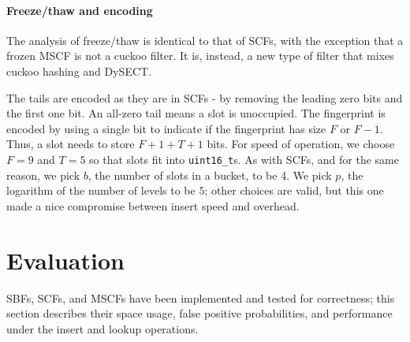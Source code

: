 \documentclass[letterpaper,twocolumn,10pt]{article}
\newcommand{\taffy}{stretchy}
\newcommand{\TBF}{SBF}
\newcommand{\TCF}{SCF}
\newcommand{\MTCF}{MSCF}
\newcommand{\taffy}{taffy}
\newcommand{\TBF}{TBF}
\newcommand{\TCF}{TCF}
\newcommand{\MTCF}{MTCF}
\begin{document}
\paragraph{Freeze/thaw and encoding}
The analysis of freeze/thaw is identical to that of \TCF{}s, with the exception that a frozen \MTCF{} is not a cuckoo filter.
It is, instead, a new type of filter that mixes cuckoo hashing and DySECT.

The tails are encoded as they are in \TCF{}s - by removing the leading zero bits and the first one bit.
An all-zero tail means a slot is unoccupied.
The fingerprint is encoded by using a single bit to indicate if the fingerprint has size $F$ or $F-1$.
Thus, a slot needs to store $F + 1 + T + 1$ bits.
For speed of operation, we choose $F = 9$ and $T = 5$ so that slots fit into {\tt uint16\_t}s.
As with \TCF{}s, and for the same reason, we pick $b$, the number of slots in a bucket, to be 4.
We pick $p$, the logarithm of the number of levels to be $5$; other choices are valid, but this one made a nice compromise between insert speed and overhead.



\section{Evaluation}
\label{eval}


\TBF{}s, \TCF{}s, and \MTCF{}s have been implemented and tested for correctness; this section describes their space usage, false positive probabilities, and performance under the insert and lookup operations.
\end{document}
